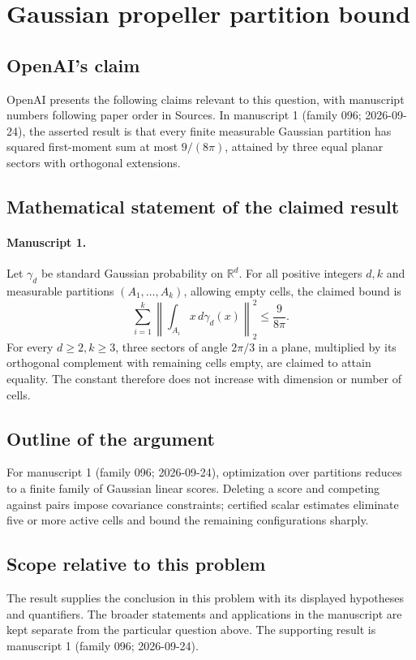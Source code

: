 \documentclass[11pt]{article}
\begin{document}
\section*{Gaussian propeller partition bound}

\subsection{OpenAI's claim}
OpenAI presents the following claims relevant to this question, with manuscript numbers following paper order in Sources. In manuscript 1 (family 096; 2026-09-24), the asserted result is that every finite measurable Gaussian partition has squared first-moment sum at most $9/(8\pi)$, attained by three equal planar sectors with orthogonal extensions.

\subsection{Mathematical statement of the claimed result}
\paragraph{Manuscript 1.}
Let $\gamma_d$ be standard Gaussian probability on $\mathbb R^d$. For all positive integers $d,k$ and measurable partitions $(A_1,\ldots,A_k)$, allowing empty cells, the claimed bound is
\[
 \sum_{i=1}^k\left\|\int_{A_i}x\,d\gamma_d(x)\right\|_2^2\le\frac9{8\pi}.
\]
For every $d\ge2,k\ge3$, three sectors of angle $2\pi/3$ in a plane, multiplied by its orthogonal complement with remaining cells empty, are claimed to attain equality. The constant therefore does not increase with dimension or number of cells.

\subsection{Outline of the argument}
For manuscript 1 (family 096; 2026-09-24), optimization over partitions reduces to a finite family of Gaussian linear scores. Deleting a score and competing against pairs impose covariance constraints; certified scalar estimates eliminate five or more active cells and bound the remaining configurations sharply.

\subsection{Scope relative to this problem}
The result supplies the conclusion in this problem with its displayed hypotheses and quantifiers. The broader statements and applications in the manuscript are kept separate from the particular question above. The supporting result is manuscript 1 (family 096; 2026-09-24).
\end{document}
